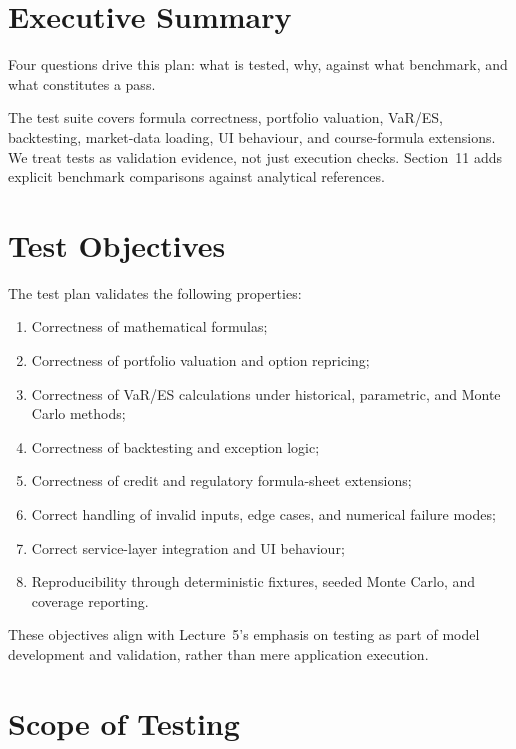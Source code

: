 \documentclass[11pt]{article}
\begin{document}
\section{Executive Summary}

Four questions drive this plan: what is tested, why, against what
benchmark, and what constitutes a pass.

The test suite covers formula correctness, portfolio valuation,
VaR/ES, backtesting, market-data loading, UI behaviour, and
course-formula extensions.  We treat tests as validation evidence,
not just execution checks.  Section~11 adds explicit benchmark
comparisons against analytical references.

\section{Test Objectives}

The test plan validates the following properties:

\begin{enumerate}
  \item Correctness of mathematical formulas;
  \item Correctness of portfolio valuation and option repricing;
  \item Correctness of VaR/ES calculations under historical, parametric, and Monte Carlo methods;
  \item Correctness of backtesting and exception logic;
  \item Correctness of credit and regulatory formula-sheet extensions;
  \item Correct handling of invalid inputs, edge cases, and numerical failure modes;
  \item Correct service-layer integration and UI behaviour;
  \item Reproducibility through deterministic fixtures, seeded Monte Carlo, and coverage reporting.
\end{enumerate}

These objectives align with Lecture~5's emphasis on testing as part of
model development and validation, rather than mere application execution.

\section{Scope of Testing}
\end{document}
